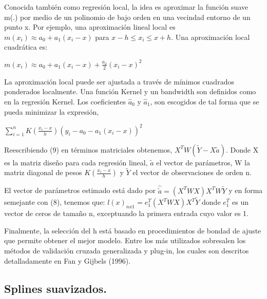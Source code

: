 \hspace*{0.4 cm} Conocida tambi\'en como regresi\'on local, la idea es aproximar la funci\'on suave m(.) por medio de un polinomio de bajo orden en una vecindad entorno de un punto x. Por ejemplo, una aproximaci\'on lineal local es $m(x_{i}) \approx a_{0} + a_{1}(x_{i}-x)$ para $x - h \leq x_{i} \leq x+h$. Una aproximaci\'on local cuadr\'atica es:

\begin{center}
$\displaystyle{m(x_{i}) \approx  a_{0} + a_{1}(x_{i}-x) + \frac{a_{2}}{2}(x_{i}-x)^2}$
\end{center}

\hspace*{0.4 cm} La aproximaci\'on local puede ser ajustada a trav\'es de m\'inimos cuadrados ponderados localmente. Una funci\'on Kernel y un bandwidth son definidos como en la regresi\'on Kernel. Los coeficientes $\hat{a}_{0}$ y $\hat{a}_{1}$, son escogidos de tal forma que se pueda minimizar la expresi\'on,

\begin{center}
$\displaystyle{ \sum_{i=1}^{n} K(\frac{x_{i}-x}{h}) (y_{i}-a_{0}-a_{1}(x_{i}-x))^2 }$
\end{center}


\hspace*{0.4 cm} Reescribiendo (9) en t\'erminos matriciales obtenemos, $X^{T}W(\tilde{Y}-X \tilde{a})$. Donde X es la matriz dise\~no para cada regresi\'on lineal, $\tilde{a}$ el vector de
par\'ametros, W la matriz diagonal de pesos $K(\frac{x_{i}-x}{h})$ y $\tilde{Y}$ el vector de observaciones de orden n.


\hspace*{0.4 cm} El vector de par\'ametros estimado est\'a dado por $ \hat{\tilde{a}} = (X^{T}WX)X^{T}W \tilde{Y} $
y en forma semejante con (8), tenemos que: $l(x)_{nx1} = e_{1}^{T} (X^{T}WX)X^{T} \tilde{Y}$ donde $e_{1}^{T}$
es un vector de ceros de tama\~no n, exceptuando la primera entrada cuyo valor es 1.

\hspace*{0.4 cm}Finalmente, la selecci\'on del h est\'a basado en procedimientos de bondad de ajuste que permite obtener el mejor modelo. Entre los m\'as utilizados sobresalen los m\'etodos de validaci\'on cruzada generalizada y plug-in, los cuales son descritos detalladamente en Fan y Gijbels (1996).

\subsection{Splines suavizados.\\}




